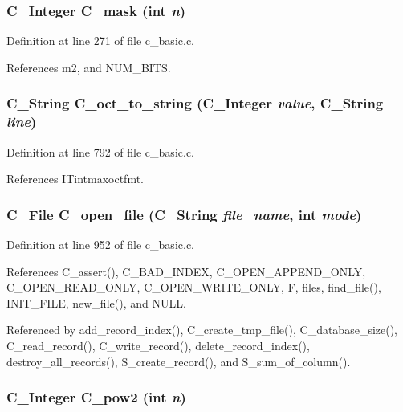 \subsubsection{\setlength{\rightskip}{0pt plus 5cm}\bf{C\_\-Integer} C\_\-mask (int {\em n})}\label{c__basic_8h_8b483c3d7ae7f6f18e7d4340ac2f10e5}




Definition at line 271 of file c\_\-basic.c.

References m2, and NUM\_\-BITS.
\subsubsection{\setlength{\rightskip}{0pt plus 5cm}\bf{C\_\-String} C\_\-oct\_\-to\_\-string (\bf{C\_\-Integer} {\em value}, \bf{C\_\-String} {\em line})}\label{c__basic_8h_5e082b6a1450e164f089e10f5fa3259b}




Definition at line 792 of file c\_\-basic.c.

References ITintmaxoctfmt.
\subsubsection{\setlength{\rightskip}{0pt plus 5cm}\bf{C\_\-File} C\_\-open\_\-file (\bf{C\_\-String} {\em file\_\-name}, int {\em mode})}\label{c__basic_8h_2367fe0e4da092c7cde37a0c323d30a1}




Definition at line 952 of file c\_\-basic.c.

References C\_\-assert(), C\_\-BAD\_\-INDEX, C\_\-OPEN\_\-APPEND\_\-ONLY, C\_\-OPEN\_\-READ\_\-ONLY, C\_\-OPEN\_\-WRITE\_\-ONLY, F, files, find\_\-file(), INIT\_\-FILE, new\_\-file(), and NULL.

Referenced by add\_\-record\_\-index(), C\_\-create\_\-tmp\_\-file(), C\_\-database\_\-size(), C\_\-read\_\-record(), C\_\-write\_\-record(), delete\_\-record\_\-index(), destroy\_\-all\_\-records(), S\_\-create\_\-record(), and S\_\-sum\_\-of\_\-column().
\subsubsection{\setlength{\rightskip}{0pt plus 5cm}\bf{C\_\-Integer} C\_\-pow2 (int {\em n})}\label{c__basic_8h_5a88e5380ebfbea2c8fa7c59866c422b}




